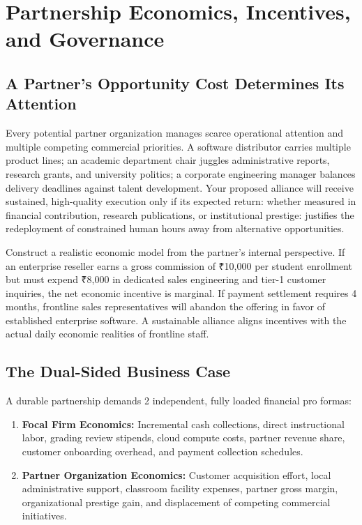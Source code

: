\section{Partnership Economics, Incentives, and Governance}
\label{sec:ch30_partnership_economics_governance}

\subsection{A Partner's Opportunity Cost Determines Its Attention}
\label{sec:partner_opportunity_cost}

Every potential partner organization manages scarce operational attention and multiple competing commercial priorities. A software distributor carries multiple product lines; an academic department chair juggles administrative reports, research grants, and university politics; a corporate engineering manager balances delivery deadlines against talent development. Your proposed alliance will receive sustained, high-quality execution only if its expected return: whether measured in financial contribution, research publications, or institutional prestige: justifies the redeployment of constrained human hours away from alternative opportunities.

Construct a realistic economic model from the partner's internal perspective. If an enterprise reseller earns a gross commission of ₹10,000 per student enrollment but must expend ₹8,000 in dedicated sales engineering and tier-1 customer inquiries, the net economic incentive is marginal. If payment settlement requires 4 months, frontline sales representatives will abandon the offering in favor of established enterprise software. A sustainable alliance aligns incentives with the actual daily economic realities of frontline staff.

\subsection{The Dual-Sided Business Case}
\label{sec:dual_sided_business_case}

A durable partnership demands 2 independent, fully loaded financial pro formas:
\begin{enumerate}
\item \textbf{Focal Firm Economics:} Incremental cash collections, direct instructional labor, grading review stipends, cloud compute costs, partner revenue share, customer onboarding overhead, and payment collection schedules.
\item \textbf{Partner Organization Economics:} Customer acquisition effort, local administrative support, classroom facility expenses, partner gross margin, organizational prestige gain, and displacement of competing commercial initiatives.
\end{enumerate}

